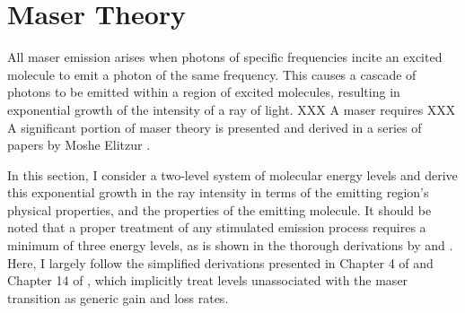 \section{Maser Theory}
\label{sec:maser_theory}

All maser emission arises when photons of specific frequencies incite an excited molecule to emit a photon of the same frequency. This causes a cascade of photons to be emitted within a region of excited molecules, resulting in exponential growth of the intensity of a ray of light. XXX A maser requires XXX A significant portion of maser theory is presented and derived in a series of papers by Moshe Elitzur \citep{Elitzur_1990, Elitzur_1990_paperI, Elitzur_1990_paperII, Elitzur_1991}.

In this section, I consider a two-level system of molecular energy levels and derive this exponential growth in the ray intensity in terms of the emitting region's physical properties, and the properties of the emitting molecule. It should be noted that a proper treatment of any stimulated emission process requires a minimum of three energy levels, as is shown in the thorough derivations by \cite{Elitzur_1992} and \cite{Gray_2009}. Here, I largely follow the simplified derivations presented in Chapter 4 of \citet{Elitzur_1992} and Chapter 14 of \citet{stahler_palla_2004}, which implicitly treat levels unassociated with the maser transition as generic gain and loss rates.

